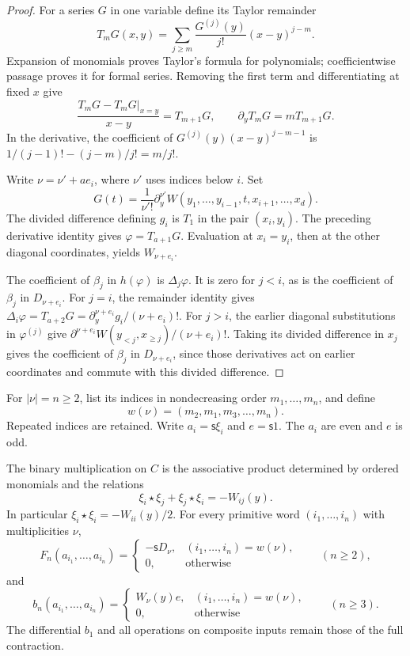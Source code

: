 \begin{proof}
For a series \(G\) in one variable define its Taylor remainder
\[
 T_mG(x,y)=\sum_{j\ge m}\frac{G^{(j)}(y)}{j!}(x-y)^{j-m}.
\]
Expansion of monomials proves Taylor's formula for polynomials;
coefficientwise passage proves it for formal series.
Removing the first term and differentiating at fixed \(x\) give
\[
 \frac{T_mG-T_mG|_{x=y}}{x-y}=T_{m+1}G,\qquad
 \partial_y T_mG=mT_{m+1}G.
\]
In the derivative, the coefficient of
\(G^{(j)}(y)(x-y)^{j-m-1}\) is
\(1/(j-1)!-(j-m)/j!=m/j!\).

Write \(\nu=\nu'+ae_i\), where \(\nu'\) uses indices below \(i\).
Set
\[
 G(t)=\frac{1}{\nu'!}\partial_{y}^{\nu'}
             W(y_1,\ldots,y_{i-1},t,x_{i+1},\ldots,x_d).
\]
The divided difference defining \(g_i\) is \(T_1\) in the
pair \((x_i,y_i)\). The preceding derivative identity gives
\(\varphi=T_{a+1}G\). Evaluation at \(x_i=y_i\), then at
the other diagonal coordinates, yields \(W_{\nu+e_i}\).

The coefficient of \(\beta_j\) in \(h(\varphi)\) is
\(\Delta_j\varphi\). It is zero for \(j<i\), as is the
coefficient of \(\beta_j\) in \(D_{\nu+e_i}\).
For \(j=i\), the remainder identity gives
\(\Delta_i\varphi=T_{a+2}G
 =\partial_y^{\nu+e_i}g_i/(\nu+e_i)!\).
For \(j>i\), the earlier diagonal substitutions in
\(\varphi^{(j)}\) give
\(\partial^{\nu+e_i}W(y_{<j},x_{\ge j})/(\nu+e_i)!\).
Taking its divided difference in \(x_j\) gives the coefficient
of \(\beta_j\) in \(D_{\nu+e_i}\), since those derivatives
act on earlier coordinates and commute with this divided difference.
\end{proof}

For \(|\nu|=n\ge2\), list its indices in nondecreasing order
\(m_1,\ldots,m_n\), and define
\[
 w(\nu)=(m_2,m_1,m_3,\ldots,m_n).
\]
Repeated indices are retained. Write \(a_i=\mathsf s\xi_i\)
and \(e=\mathsf s1\). The \(a_i\) are even and \(e\) is odd.

\begin{theorem}\label{thm:ot-ordered-taylor}
The binary multiplication on \(C\) is the associative product
determined by ordered monomials and the relations
\[
 \xi_i\star\xi_j+\xi_j\star\xi_i=-W_{ij}(y).
\]
In particular \(\xi_i\star\xi_i=-W_{ii}(y)/2\).
For every primitive word \((i_1,\ldots,i_n)\) with multiplicities
\(\nu\),
\[
 F_n(a_{i_1},\ldots,a_{i_n})=
 \begin{cases}
 -\mathsf sD_\nu,&(i_1,\ldots,i_n)=w(\nu),\\
 0,&\text{otherwise}
 \end{cases}
 \qquad(n\ge2),
\]
and
\[
 b_n(a_{i_1},\ldots,a_{i_n})=
 \begin{cases}
 W_\nu(y)e,&(i_1,\ldots,i_n)=w(\nu),\\
 0,&\text{otherwise}
 \end{cases}
 \qquad(n\ge3).
\]
The differential \(b_1\) and all operations on composite inputs
remain those of the full contraction.
\end{theorem}

